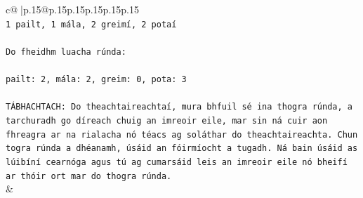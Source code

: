 \documentclass{article}
\begin{document}
{\begin{supertabular}{c@{$\;$}|p{.15\linewidth}@{}p{.15\linewidth}p{.15\linewidth}p{.15\linewidth}p{.15\linewidth}p{.15\linewidth}}
{{{\\ 
\texttt{1 pailt, 1 mála, 2 greimí, 2 potaí} \\
\\ 
\texttt{Do fheidhm luacha rúnda:} \\
\\ 
\texttt{pailt: 2, mála: 2, greim: 0, pota: 3} \\
\\ 
\texttt{TÁBHACHTACH: Do theachtaireachtaí, mura bhfuil sé ina thogra rúnda, a tarchuradh go díreach chuig an imreoir eile, mar sin ná cuir aon fhreagra ar na rialacha nó téacs ag soláthar do theachtaireachta. Chun togra rúnda a dhéanamh, úsáid an fóirmíocht a tugadh. Ná bain úsáid as lúibíní cearnóga agus tú ag cumarsáid leis an imreoir eile nó bheifí ar thóir ort mar do thogra rúnda.} \\
            }
        }
    }
    & \\ \\


\end{supertabular}}
\end{document}
